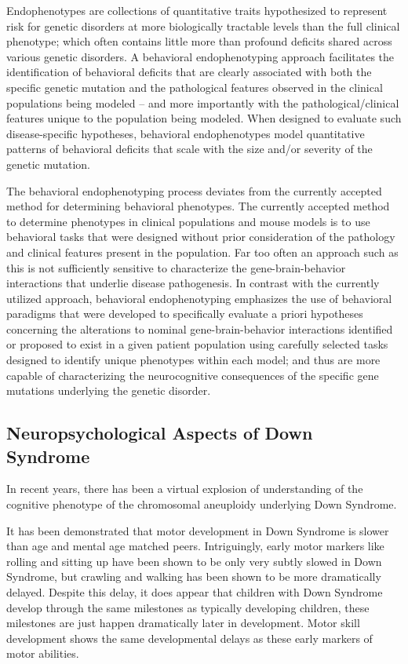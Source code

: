 \documentclass{article}
\begin{document}
Endophenotypes are collections of quantitative traits hypothesized to represent risk for genetic disorders at more biologically tractable levels than the full clinical phenotype; which often contains little more than profound deficits shared across various genetic disorders. A behavioral endophenotyping approach facilitates the identification of behavioral deficits that are clearly associated with both the specific genetic mutation and the pathological features observed in the clinical populations being modeled -- and more importantly with the pathological/clinical features unique to the population being modeled. When designed to evaluate such disease-specific hypotheses, behavioral endophenotypes model quantitative patterns of behavioral deficits that scale with the size and/or severity of the genetic mutation.

The behavioral endophenotyping process deviates from the currently accepted method for determining behavioral phenotypes. The currently accepted method to determine phenotypes in clinical populations and mouse models is to use behavioral tasks that were designed without prior consideration of the pathology and clinical features present in the population. Far too often an approach such as this is not sufficiently sensitive to characterize the gene-brain-behavior interactions that underlie disease pathogenesis. In contrast with the currently utilized approach, behavioral endophenotyping emphasizes the use of behavioral paradigms that were developed to specifically evaluate a priori hypotheses concerning the alterations to nominal gene-brain-behavior interactions identified or proposed to exist in a given patient population using carefully selected tasks designed to identify unique phenotypes within each model; and thus are more capable of characterizing the neurocognitive consequences of the specific gene mutations underlying the genetic disorder.

\subsection{Neuropsychological Aspects of Down Syndrome}

In recent years, there has been a virtual explosion of understanding of the cognitive phenotype of the chromosomal aneuploidy underlying Down Syndrome.

It has been demonstrated that motor development in Down Syndrome is slower than age and mental age matched peers. Intriguingly, early motor markers like rolling and sitting up have been shown to be only very subtly slowed in Down Syndrome, but crawling and walking has been shown to be more dramatically delayed. Despite this delay, it does appear that children with Down Syndrome develop through the same milestones as typically developing children, these milestones are just happen dramatically later in development. Motor skill development shows the same developmental delays as these early markers of motor abilities.
\end{document}
